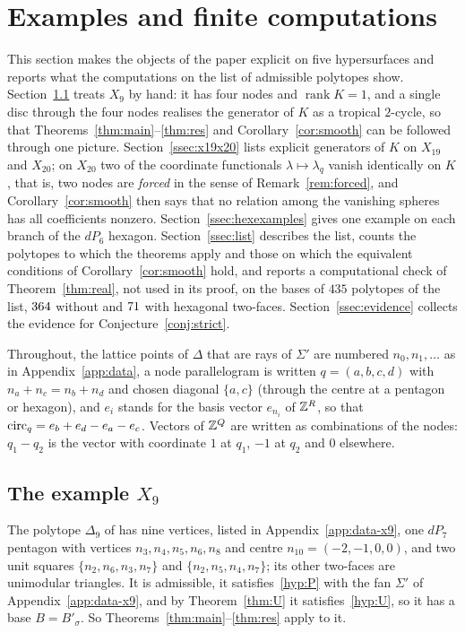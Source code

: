 \section{Examples and finite computations}\label{sec:examples}


This section makes the objects of the paper explicit on five hypersurfaces and reports what the computations on the
list of admissible polytopes show. Section~\ref{ssec:x9} treats $X_9$ by hand: it has four nodes and $\operatorname{rank}K=1$,
and a single disc through the four nodes realises the generator of $K$ as a tropical $2$-cycle, so that
Theorems~\ref{thm:main}--\ref{thm:res} and Corollary~\ref{cor:smooth} can be followed through one picture.
Section~\ref{ssec:x19x20} lists explicit generators of $K$ on $X_{19}$ and $X_{20}$; on $X_{20}$ two of the coordinate
functionals $\lambda\mapsto\lambda_q$ vanish identically on $K$, that is, two nodes are \emph{forced} in the sense of
Remark~\ref{rem:forced}, and Corollary~\ref{cor:smooth} then says that no relation among the vanishing spheres has all
coefficients nonzero. Section~\ref{ssec:hexexamples} gives one example on each branch of the $dP_6$ hexagon.
Section~\ref{ssec:list} describes the list, counts the polytopes to which the theorems apply and those on which the
equivalent conditions of Corollary~\ref{cor:smooth} hold, and reports a computational check of
Theorem~\ref{thm:real}, not used in its proof, on the bases of $435$ polytopes of the list, $364$ without and
$71$ with hexagonal two-faces. Section~\ref{ssec:evidence} collects the evidence for Conjecture~\ref{conj:strict}.

Throughout, the lattice points of $\Delta$ that are rays of $\Sigma'$ are numbered $n_0,n_1,\dots$ as in
Appendix~\ref{app:data}, a node parallelogram is written $q=(a,b,c,d)$ with $n_a+n_c=n_b+n_d$ and chosen diagonal
$\{a,c\}$ (through the centre at a pentagon or hexagon), and $e_i$ stands for the basis vector $e_{n_i}$ of $\mathbb Z^R$, so
that $\mathrm{circ}_q=e_b+e_d-e_a-e_c$. Vectors of $\mathbb Z^Q$ are written as combinations of the nodes: $q_1-q_2$ is the vector with
coordinate $1$ at $q_1$, $-1$ at $q_2$ and $0$ elsewhere.

\subsection{The example \texorpdfstring{$X_9$}{X9}}\label{ssec:x9}
The polytope $\Delta_9$ of \cite{Paper5} has nine vertices, listed in Appendix~\ref{app:data-x9}, one $dP_7$ pentagon
with vertices $n_3,n_4,n_5,n_6,n_8$ and centre $n_{10}=(-2,-1,0,0)$, and two unit squares
$\{n_2,n_6,n_3,n_7\}$ and $\{n_2,n_5,n_4,n_7\}$; its other two-faces are unimodular triangles. It is admissible, it
satisfies~\ref{hyp:P} with the fan $\Sigma'$ of Appendix~\ref{app:data-x9}, and by Theorem~\ref{thm:U} it satisfies~\ref{hyp:U}, so it has a base
$B=B'_\sigma$. So Theorems~\ref{thm:main}--\ref{thm:res} apply to it.

